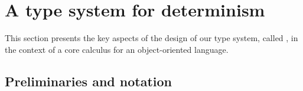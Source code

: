 \section{A type system for determinism}\label{design}

This section presents the key aspects of the design of our type system,
called \ourTypeSystem, in the context of a core calculus for an
object-oriented language.


\subsection{Preliminaries and notation}

